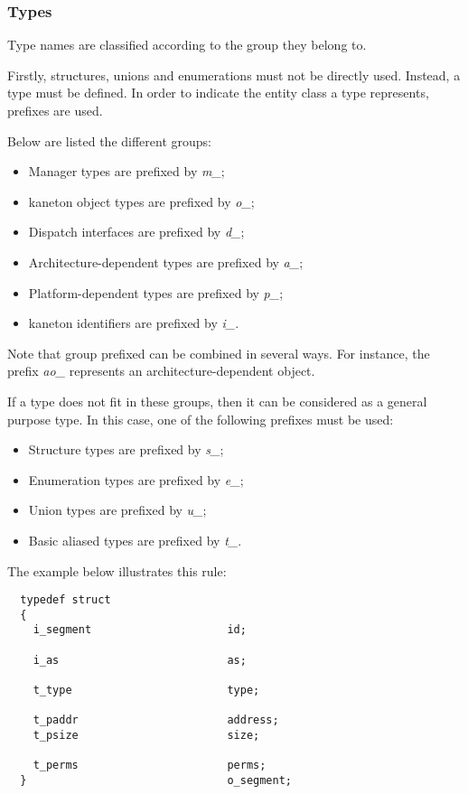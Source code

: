 
\subsubsection{Types}

Type names are classified according to the group they belong to.

Firstly, structures, unions and enumerations must not be directly used.
Instead, a type must be defined. In order to indicate the entity class a type
represents, prefixes are used.

Below are listed the different groups:

\begin{itemize}
  \item
    Manager types are prefixed by \textit{m\_};
  \item
    kaneton object types are prefixed by \textit{o\_};
  \item
    Dispatch interfaces are prefixed by \textit{d\_};
  \item
    Architecture-dependent types are prefixed by \textit{a\_};
  \item
    Platform-dependent types are prefixed by \textit{p\_};
  \item
    kaneton identifiers are prefixed by \textit{i\_}.
\end{itemize}

Note that group prefixed can be combined in several ways. For instance,
the prefix \textit{ao\_} represents an architecture-dependent object.

If a type does not fit in these groups, then it can be considered as a
general purpose type. In this case, one of the following prefixes must be used:

\begin{itemize}
  \item
    Structure types are prefixed by \textit{s\_};
  \item
    Enumeration types are prefixed by \textit{e\_};
  \item
    Union types are prefixed by \textit{u\_};
  \item
    Basic aliased types are prefixed by \textit{t\_}.
\end{itemize}

The example below illustrates this rule:

\begin{verbatim}
  typedef struct
  {
    i_segment                     id;

    i_as                          as;

    t_type                        type;

    t_paddr                       address;
    t_psize                       size;

    t_perms                       perms;
  }                               o_segment;
\end{verbatim}

